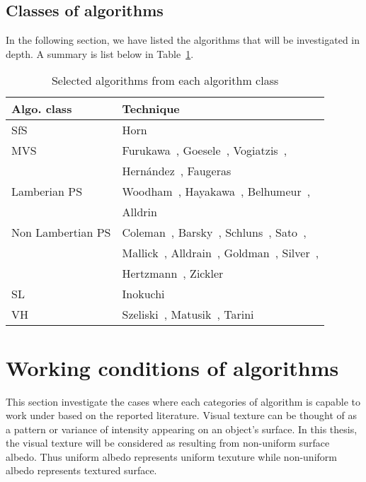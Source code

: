 \subsection{Classes of algorithms}
In the following section, we have listed the algorithms that will be investigated in depth. A summary is list below in Table~\ref{tab:class_algo}.
\begin{table}[!htbp]
  \centering
  \begin{tabular}{l|l}
  \toprule
  \textbf{Algo. class} & \textbf{Technique}\\
  \midrule
  SfS & Horn~\cite{horn1970shape}\\
  MVS & Furukawa~\cite{furukawa2010accurate}, Goesele~\cite{goesele2006multi}, Vogiatzis~\cite{vogiatzis2007multiview}, \\
      & Hern{\'a}ndez~\cite{esteban2004silhouette}, Faugeras~\cite{faugeras2002variational}\\
  Lamberian PS & Woodham~\cite{woodham1980photometric}, Hayakawa~\cite{hayakawa1994photometric}, Belhumeur~\cite{belhumeur1999bas}, \\
      & Alldrin~\cite{alldrin2007resolving}\\
  Non Lambertian PS & Coleman~\cite{coleman1982obtaining}, Barsky~\cite{barsky20034}, Schluns~\cite{schluns1993photometric}, Sato~\cite{sato1994temporal}, \\
      & Mallick~\cite{mallick2005beyond}, Alldrain~\cite{alldrin2008photometric}, Goldman~\cite{goldman2010shape}, Silver~\cite{silver1980determining}, \\
      & Hertzmann~\cite{hertzmann2005example}, Zickler~\cite{zickler2002helmholtz}\\
  SL & Inokuchi~\cite{inokuchi1984range}\\
  VH & Szeliski~\cite{szeliski1993rapid}, Matusik~\cite{matusik2002efficient}, Tarini~\cite{tarini2002marching}\\
  \bottomrule
  \end{tabular}
  \caption{Selected algorithms from each algorithm class}
  \label{tab:class_algo}
\end{table}

\section{Working conditions of algorithms}
This section investigate the cases where each categories of algorithm is capable to work under based on the reported literature. Visual texture can be thought of as a pattern or variance of intensity appearing on an object's surface. In this thesis, the visual texture will be considered as resulting from non-uniform surface albedo. Thus uniform albedo represents uniform texuture while non-uniform albedo represents textured surface.

